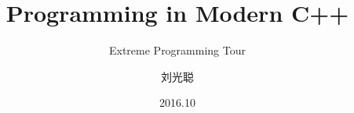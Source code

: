 \title[Extreme Programming Tour]
{Programming in Modern C++}

\subtitle{Extreme Programming Tour}

\author[刘光聪]
{ 刘光聪
}

\institute[]
{
}

\date[2016.10]{2016.10}